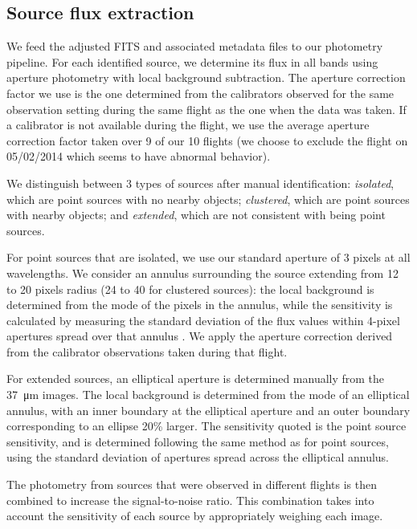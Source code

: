 \subsection{Source flux extraction}

We feed the adjusted FITS and associated metadata files to our photometry pipeline. For each identified source, we determine its flux in all bands using aperture photometry with local background subtraction. The aperture correction factor we use is the one determined from the calibrators observed for the same observation setting during the same flight as the one when the data was taken. If a calibrator is not available during the flight, we use the average aperture correction factor taken over 9 of our 10 flights (we choose to exclude the flight on 05/02/2014 which seems to have abnormal behavior).

We distinguish between 3 types of sources after manual identification: \textit{isolated}, which are point sources with no nearby objects; \textit{clustered}, which are point sources with nearby objects; and \textit{extended}, which are not consistent with being point sources. 

For point sources that are isolated, we use our standard aperture of 3 pixels at all wavelengths. We consider an annulus surrounding the source extending from 12 to 20 pixels radius (24 to 40 for clustered sources): the local background is determined from the mode of the pixels in the annulus, while the sensitivity is calculated by measuring the standard deviation of the flux values within 4-pixel apertures spread over that annulus \citep{Shimizu:2016if}. We apply the aperture correction derived from the calibrator observations taken during that flight.

For extended sources, an elliptical aperture is determined manually from the \SI{37}{\micro\meter} images. The local background is determined from the mode of an elliptical annulus, with an inner boundary at the elliptical aperture and an outer boundary corresponding to an ellipse 20\% larger. The sensitivity quoted is the point source sensitivity, and is determined following the same method as for point sources, using the standard deviation of apertures spread across the elliptical annulus. 

The photometry from sources that were observed in different flights is then combined to increase the signal-to-noise ratio. This combination takes into account the sensitivity of each source by appropriately weighing each image.

